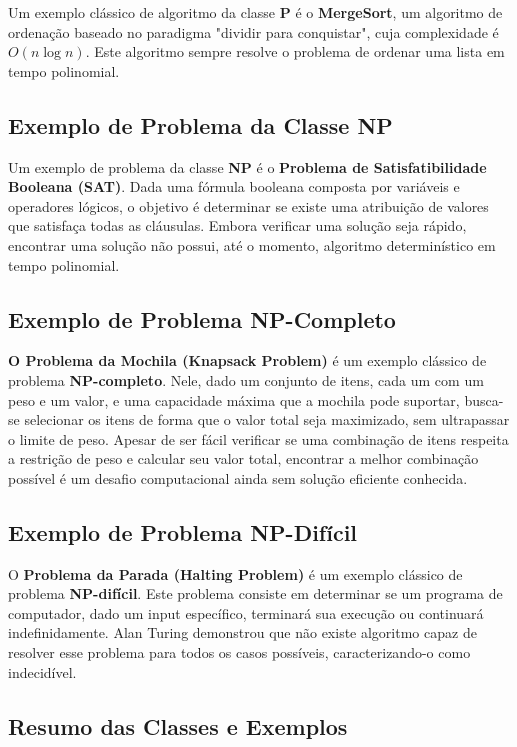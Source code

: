 \documentclass[12pt,oneside,a4paper]{report}
\begin{document}
Um exemplo clássico de algoritmo da classe \textbf{P} é o \textbf{MergeSort}, um algoritmo de ordenação baseado no paradigma "dividir para conquistar", cuja complexidade é \( O(n \log n) \). Este algoritmo sempre resolve o problema de ordenar uma lista em tempo polinomial.

\subsection{Exemplo de Problema da Classe NP}

Um exemplo de problema da classe \textbf{NP} é o \textbf{Problema de Satisfatibilidade Booleana (SAT)}. Dada uma fórmula booleana composta por variáveis e operadores lógicos, o objetivo é determinar se existe uma atribuição de valores que satisfaça todas as cláusulas. Embora verificar uma solução seja rápido, encontrar uma solução não possui, até o momento, algoritmo determinístico em tempo polinomial.

\subsection{Exemplo de Problema NP-Completo}

\textbf{O Problema da Mochila (Knapsack Problem)} é um exemplo clássico de problema \textbf{NP-completo}. Nele, dado um conjunto de itens, cada um com um peso e um valor, e uma capacidade máxima que a mochila pode suportar, busca-se selecionar os itens de forma que o valor total seja maximizado, sem ultrapassar o limite de peso. Apesar de ser fácil verificar se uma combinação de itens respeita a restrição de peso e calcular seu valor total, encontrar a melhor combinação possível é um desafio computacional ainda sem solução eficiente conhecida.

\subsection{Exemplo de Problema NP-Difícil}

O \textbf{Problema da Parada (Halting Problem)} é um exemplo clássico de problema \textbf{NP-difícil}. Este problema consiste em determinar se um programa de computador, dado um input específico, terminará sua execução ou continuará indefinidamente. Alan Turing demonstrou que não existe algoritmo capaz de resolver esse problema para todos os casos possíveis, caracterizando-o como indecidível.

\subsection{Resumo das Classes e Exemplos}
\end{document}
